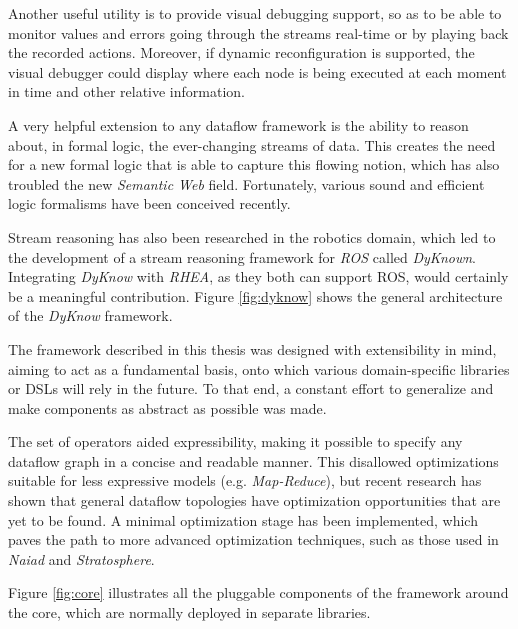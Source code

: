\documentclass{dithesis}
\begin{document}
Another useful utility is to provide visual debugging support, so as to be able to monitor values and errors going through the streams real-time or by playing back the recorded actions. Moreover, if dynamic reconfiguration is supported, the visual debugger could display where each node is being executed at each moment in time and other relative information.


A very helpful extension to any dataflow framework is the ability to reason about, in formal logic, the ever-changing streams of data. This creates the need for a new formal logic that is able to capture this flowing notion, which has also troubled the new \textit{Semantic Web} field\cite{streaming_world}. Fortunately, various sound and efficient logic formalisms have been conceived recently\cite{pdt_logic,asp}.

Stream reasoning has also been researched in the robotics domain\cite{robot_reasoning}, which led to the development of a stream reasoning framework for \textit{ROS} called \textit{DyKnown}\cite{stream_reasoning}. Integrating \textit{DyKnow} with \textit{RHEA}, as they both can support ROS, would certainly be a meaningful contribution. Figure \ref{fig:dyknow} shows the general architecture of the \textit{DyKnow} framework.



The framework described in this thesis was designed with extensibility in mind, aiming to act as a fundamental basis, onto which various domain-specific libraries or DSLs will rely in the future. To that end, a constant effort to generalize and make components as abstract as possible was made. 

The set of operators aided expressibility, making it possible to specify any dataflow graph in a concise and readable manner. This disallowed optimizations suitable for less expressive models (e.g. \textit{Map-Reduce}), but recent research has shown that general dataflow topologies have optimization opportunities that are yet to be found\cite{blackbox}. A minimal optimization stage has been implemented, which paves the path to more advanced optimization techniques, such as those used in \textit{Naiad}\cite{naiad} and \textit{Stratosphere}\cite{static_analysis}.

Figure \ref{fig:core} illustrates all the pluggable components of the framework around the core, which are normally deployed in separate libraries.
\end{document}
